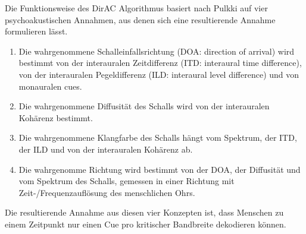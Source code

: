 Die Funktionsweise des DirAC Algorithmus basiert nach Pulkki \cite{pulkki} auf vier psychoakustischen Annahmen, aus denen sich eine resultierende Annahme formulieren lässt.

\begin{enumerate}
    \item Die wahrgenommene Schalleinfallsrichtung (DOA: direction of arrival) wird bestimmt von der interauralen Zeitdifferenz (ITD: interaural time difference), von der interauralen Pegeldifferenz (ILD: interaural level difference) und von monauralen cues.
    \item Die wahrgenommene Diffusität des Schalls wird von der interauralen Kohärenz bestimmt.
    \item Die wahrgenommene Klangfarbe des Schalls hängt vom Spektrum, der ITD, der ILD und von der interauralen Kohärenz ab.
    \item Die wahrgenomme Richtung wird bestimmt von der DOA, der Diffusität und vom Spektrum des Schalls, gemessen in einer Richtung mit Zeit-/Frequenzauflösung des menschlichen Ohrs.
\end{enumerate}

Die resultierende Annahme aus diesen vier Konzepten ist, dass Menschen zu einem Zeitpunkt nur einen Cue pro kritischer Bandbreite dekodieren können.
